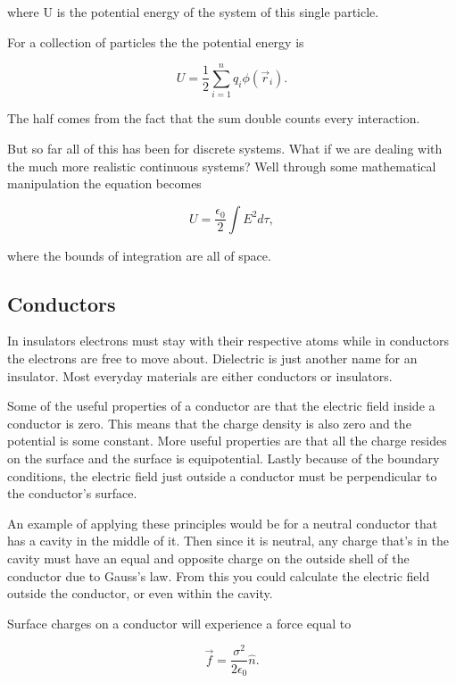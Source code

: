 \documentclass[preprint, review,12pt]{elsarticle}
\begin{document}
where U is the potential energy of the system of this single particle.

For a collection of particles the the potential energy is

\begin{equation}
    U = \frac{1}{2}\sum_{i=1}^n q_i \phi(\vec{r}_i).
\end{equation}

The half comes from the fact that the sum double counts every interaction.

But so far all of this has been for discrete systems. What if we are dealing with the much more realistic continuous systems? Well through some mathematical manipulation the equation becomes 

\begin{equation}
    U = \frac{\epsilon_0}{2}\int E^2 d\tau, 
\end{equation}

where the bounds of integration are all of space.

\subsection{Conductors}

In insulators electrons must stay with their respective atoms while in conductors the electrons are free to move about. Dielectric is just another name for an insulator. Most everyday materials are either conductors or insulators. 

Some of the useful properties of a conductor are that the electric field inside a conductor is zero. This means that the charge density is also zero and the potential is some constant. More useful properties are that all the charge resides on the surface and the surface is equipotential. Lastly because of the boundary conditions, the electric field just outside a conductor must be perpendicular to the conductor's surface. 

An example of applying these principles would be for a neutral conductor that has a cavity in the middle of it. Then since it is neutral, any charge that's in the cavity must have an equal and opposite charge on the outside shell of the conductor due to Gauss's law. From this you could calculate the electric field outside the conductor, or even within the cavity.

Surface charges on a conductor will experience a force equal to 

\begin{equation}
    \vec{f} = \frac{\sigma^2}{2 \epsilon_0} \hat{n}.
\end{equation}
\end{document}
